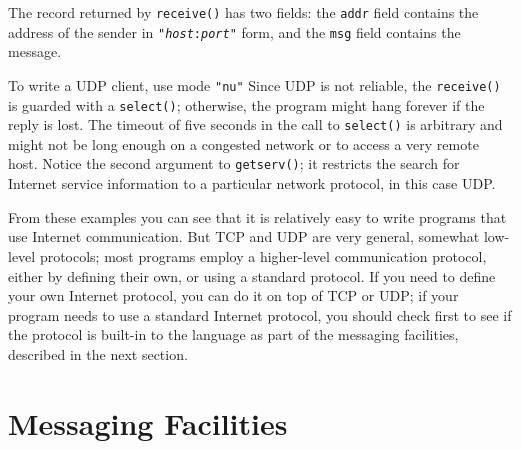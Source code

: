 The record returned by \texttt{receive()} has two fields: the
\texttt{addr} field contains the address of the sender in
\texttt{"}\texttt{\textit{host}}\texttt{:}\texttt{\textit{port}}\texttt{"}
form, and the \texttt{msg} field contains the message.

To write a UDP client, use mode \texttt{"nu"}
Since UDP is not reliable, the \texttt{receive()} is guarded
with a \texttt{select()}; otherwise, the program might hang forever if
the reply is lost. The timeout of five seconds in the call to
\texttt{select()} is arbitrary and might not be long enough on a
congested network or to access a very remote host. Notice the second
argument to \texttt{getserv()}; it restricts the search for Internet
service information to a particular network protocol, in this case UDP.


From these examples you can see that it is relatively easy to write
programs that use Internet communication. But TCP and UDP are very
general, somewhat low-level protocols; most programs employ a
higher-level communication protocol, either by defining their own, or
using a standard protocol. If you need to define your own Internet
protocol, you can do it on top of TCP or UDP; if your program needs to
use a standard Internet protocol, you should check first to see if the
protocol is built-in to the language as part of the messaging
facilities, described in the next section.

\section{Messaging Facilities}

